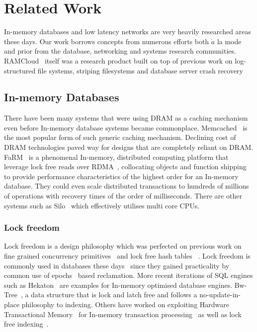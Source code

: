 
\chapter{Related Work}
In-memory databases and low latency networks are very heavily researched areas
these days. Our work borrows concepts from numerous efforts both $\grave{a}$
 la mode and prior from the database, networking and systems research communities.
RAMCloud~\cite{ramcloud} itself was a research product built on top of previous 
work on log-structured file systems, striping filesystems and database server 
crash recovery~\cite{ryan-thesis}

\section{In-memory Databases}
There have been many systems that were using DRAM as a caching mechanism even before
In-memory database systems became commonplace. Memcached~\cite{memcached} is 
the most popular form of such generic caching mechanism. Declining cost of DRAM 
technologies paved way for designs that are completely reliant on DRAM.
FaRM~\cite{farm} is a phenomenal In-memory, distributed computing platform that leverage lock free reads over RDMA~\cite{rdma},
collocating objects and function shipping to provide performance characteristics of the 
highest order for an In-memory database. They could even scale distributed transactions to
hundreds of millions of operations with recovery times of the order of milliseconds. There 
are other systems such as Silo~\cite{silo} which effectively utilises multi core CPUs.

\subsection{Lock freedom}
Lock freedom is a design philosophy which was perfected on previous work on fine grained concurrency 
primitives~\cite{finegrained} and lock free hash tables ~\cite{lockfreeht}. Lock freedom is commonly
used in databases these days~\cite{htm} since they gained practicality by common use of
epochs~\cite{lockfreedom} based reclamation. 
More recent iterations of SQL engines such as Hekaton~\cite{hekaton} are 
examples for In-memory optimised  database engines. Bw-Tree~\cite{bw-tree}, a 
data structure that is lock and latch free and follows a no-update-in-place philosophy to indexing.
Others have worked on exploiting Hardware Transactional Memory~\cite{htm-old}
for In-memory transaction processing~\cite{drtm} as well as lock free indexing~\cite{htm}.


